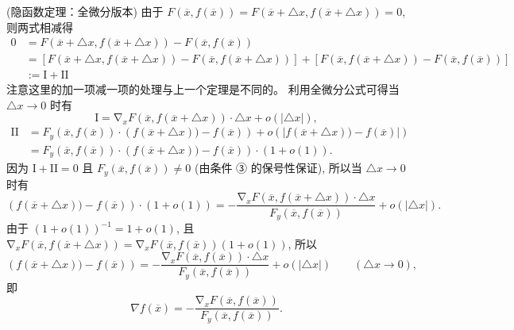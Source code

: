\begin{theorem}{(隐函数定理：全微分版本)}
由于 $F(\overline{x},f(\overline{x}))=F(\overline{x}+\triangle x,f(\overline{x}+\triangle x))=0$,
则两式相减得
\begin{equation}
\begin{aligned}
0 & = F(\overline{x}+\triangle x,f(\overline{x}+\triangle x))-F(\overline{x},f(\overline{x}))\\
 & = \left[F(\overline{x}+\triangle x,f(\overline{x}+\triangle x))-F(\overline{x},f(\overline{x}+\triangle x))\right]+\left[F(\overline{x},f(\overline{x}+\triangle x))-F(\overline{x},f(\overline{x}))\right]\\
 & := \mathrm{I}+\mathrm{II}
\end{aligned}
\end{equation}
注意这里的加一项减一项的处理与上一个定理是不同的。 利用全微分公式可得当 $\triangle x\rightarrow0$ 时有
\[
\mathrm{I}=\mathrm{\nabla}_{x}F(\overline{x},f(\overline{x}+\triangle x))\cdot\triangle x+o(|\triangle x|),
\]
\begin{equation}
\begin{aligned}
\mathrm{II} & = F_{y}(\overline{x},f(\overline{x}))\cdot\left(f(\overline{x}+\triangle x))-f(\overline{x})\right)+o\left(|f(\overline{x}+\triangle x))-f(\overline{x})|\right)\\
 & = F_{y}(\overline{x},f(\overline{x}))\cdot\left(f(\overline{x}+\triangle x))-f(\overline{x})\right)\cdot(1+o(1)).
\end{aligned}
\end{equation}
因为 $\mathrm{I}+\mathrm{II}=0$ 且 $F_{y}(\overline{x},f(\overline{x}))\neq0$
(由条件 ③ 的保号性保证), 所以当 $\triangle x\rightarrow0$ 时有
\[
\left(f(\overline{x}+\triangle x))-f(\overline{x})\right)\cdot(1+o(1))={\displaystyle -\frac{\mathrm{\nabla}_{x}F(\overline{x},f(\overline{x}+\triangle x))\cdot\triangle x}{F_{y}(\overline{x},f(\overline{x}))}+o(|\triangle x|).}
\]
由于 $(1+o(1))^{-1}=1+o(1)$, 且 $\mathrm{\nabla}_{x}F(\overline{x},f(\overline{x}+\triangle x))=\mathrm{\nabla}_{x}F(\overline{x},f(\overline{x}))(1+o(1))$,
所以
\[
\left(f(\overline{x}+\triangle x))-f(\overline{x})\right)={\displaystyle -\frac{\mathrm{\nabla}_{x}F(\overline{x},f(\overline{x}))\cdot\triangle x}{F_{y}(\overline{x},f(\overline{x}))}+o(|\triangle x|)\quad\quad(\triangle x\rightarrow0),}
\]
即 
\[
\nabla f(\overline{x})=-\frac{\mathrm{\nabla}_{x}F(\overline{x},f(\overline{x}))}{F_{y}(\overline{x},f(\overline{x}))}.
\]
\end{theorem}
